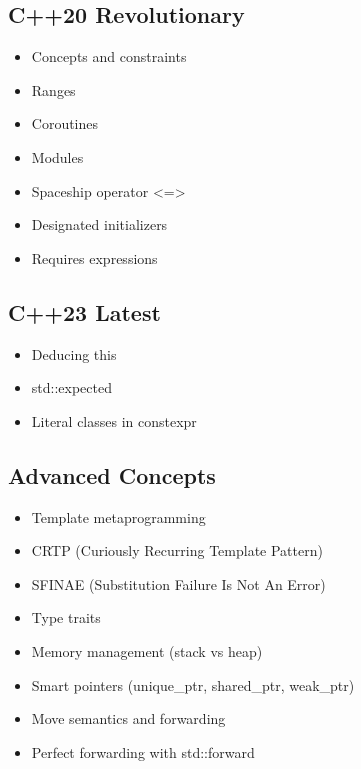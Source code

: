 \hypertarget{c20-revolutionary}{%
\subsection{C++20 Revolutionary}\label{c20-revolutionary}}

\begin{itemize}
\tightlist
\item
  Concepts and constraints
\item
  Ranges
\item
  Coroutines
\item
  Modules
\item
  Spaceship operator \textless=\textgreater{}
\item
  Designated initializers
\item
  Requires expressions
\end{itemize}

\hypertarget{c23-latest}{%
\subsection{C++23 Latest}\label{c23-latest}}

\begin{itemize}
\tightlist
\item
  Deducing this
\item
  std::expected
\item
  Literal classes in constexpr
\end{itemize}

\hypertarget{advanced-concepts}{%
\subsection{Advanced Concepts}\label{advanced-concepts}}

\begin{itemize}
\tightlist
\item
  Template metaprogramming
\item
  CRTP (Curiously Recurring Template Pattern)
\item
  SFINAE (Substitution Failure Is Not An Error)
\item
  Type traits
\item
  Memory management (stack vs heap)
\item
  Smart pointers (unique\_ptr, shared\_ptr, weak\_ptr)
\item
  Move semantics and forwarding
\item
  Perfect forwarding with std::forward
\end{itemize}


